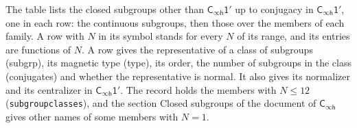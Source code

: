 \documentclass[10pt,a4paper]{article}
\numberwithin{equation}{section}
\newcommand{\grp}[1]{\mathsf{#1}}
\begin{document}
The table lists the closed subgroups other than $\grp{C_{\infty h}1'}$ up to conjugacy in $\grp{C_{\infty h}1'}$, one in each row: the continuous subgroups, then those over the members of each family. \label{n:index.family.N}A row with $N$ in its symbol stands for every $N$ of its range, and its entries are functions of $N$. \label{n:head.subgroup}\label{n:head.magnetic.type}\label{n:head.order}\label{n:head.conjugates}\label{n:head.normal}A row gives the representative of a class of subgroups (subgrp), its magnetic type (type), its order, the number of subgroups in the class (conjugates) and whether the representative is normal. \label{n:head.normalizer}\label{n:head.centralizer}It also gives its normalizer and its centralizer in $\grp{C_{\infty h}1'}$. The record holds the members with $N \le 12$ (\texttt{subgroupclasses}), and the section Closed subgroups of the document of \href{../../../rotation/data/pdf/Cinfh.pdf}{$\grp{C_{\infty h}}$} gives other names of some members with $N = 1$.
\end{document}
